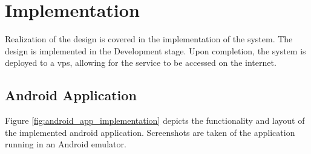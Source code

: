 \section{Implementation}
Realization of the design is covered in the implementation of the system.
The design is implemented in the Development stage.
Upon completion, the system is deployed to a \Ac{vps}, allowing for the service to be accessed on the internet.

\subsection{Android Application}
Figure \ref{fig:android_app_implementation} depicts the functionality and layout of the implemented android application.
Screenshots are taken of the application running in an Android emulator.

